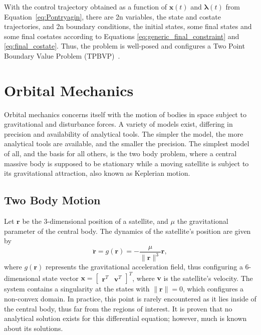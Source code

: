 With the control trajectory obtained as a function of \(\mathbf{x}(t)\) and \(\mathbf{\lambda}(t)\) from Equation~\eqref{eq:Pontryagin}, there are 2n variables, the state and costate trajectories, and 2n boundary conditions, the initial states, some final states and some final costates according to Equations \eqref{eq:generic_final_constraint} and \eqref{eq:final_costate}. Thus, the problem is well-posed and configures a Two Point Boundary Value Problem (TPBVP)~\cite{bryson_applied_optimal_control}.

\section{Orbital Mechanics}

Orbital mechanics concerns itself with the motion of bodies in space subject to gravitational and disturbance forces. A variety of models exist, differing in precision and availability of analytical tools. The simpler the model, the more analytical tools are available, and the smaller the precision. The simplest model of all, and the basis for all others, is the two body problem, where a central massive body is supposed to be stationary while a moving satellite is subject to its gravitational attraction, also known as Keplerian motion. 

\subsection{Two Body Motion}

Let \(\mathbf{r}\) be the 3-dimensional position of a satellite, and \(\mu \) the gravitational parameter of the central body. The dynamics of the satellite's position are given by~\cite{curtis2015orbital}
\begin{equation} \label{eq:kepler_dyn}
    \ddot{\mathbf{r}} = g(\mathbf{r}) = -\frac{\mu}{\lVert \mathbf{r} \rVert^3} \mathbf{r},
\end{equation}
where \(g(\mathbf{r})\) represents the gravitational acceleration field, thus configuring a 6-dimensional state vector \(\mathbf{x} = \begin{bmatrix}
    \mathbf{r}^T & \mathbf{v}^T
\end{bmatrix}^T\), where \(\mathbf{v}\) is the satellite's velocity. The system contains a singularity at the states with \(\lVert \mathbf{r} \rVert = 0\), which configures a non-convex domain. In practice, this point is rarely encountered as it lies inside of the central body, thus far from the regions of interest. It is proven that no analytical solution exists for this differential equation; however, much is known about its solutions.

